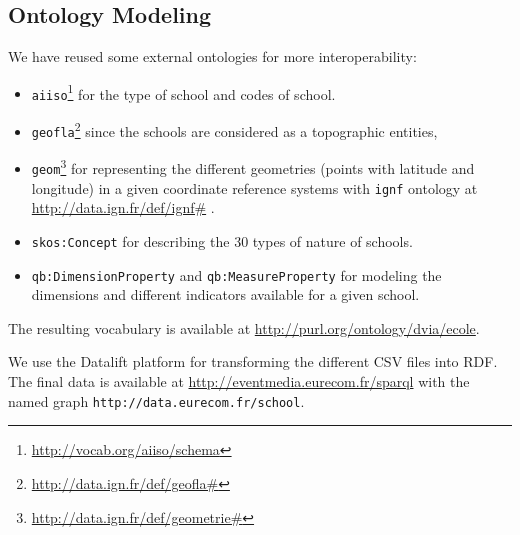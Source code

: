 \subsection{Ontology Modeling}
We have reused some external ontologies for more interoperability:
\begin{itemize}
\item \texttt{aiiso}\footnote{\url{http://vocab.org/aiiso/schema}} for the type of school and codes of school.
\item \texttt{geofla}\footnote{\url{http://data.ign.fr/def/geofla\#}} since the schools are considered as a topographic entities,
\item \texttt{geom}\footnote{\url{http://data.ign.fr/def/geometrie\#}} for representing the different geometries (points with latitude and longitude) in a given coordinate reference systems with \texttt{ignf} ontology at \url{http://data.ign.fr/def/ignf#} . 
\item \texttt{skos:Concept} for describing the 30 types of nature of schools. 
\item \texttt{qb:DimensionProperty} and \texttt{qb:MeasureProperty} \cite{dcube} for modeling the dimensions and different indicators available for a given school. 
\end{itemize}
The resulting vocabulary is available at \url{http://purl.org/ontology/dvia/ecole}. 

We use the Datalift platform for transforming the different CSV files into RDF. The final data is available  at \url{http://eventmedia.eurecom.fr/sparql} with the named graph \texttt{http://data.eurecom.fr/school}.

